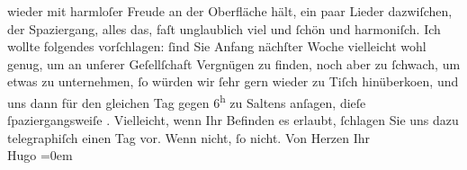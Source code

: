 \begin{ledgroupsized}[t]{13cm}
               wieder mit harmloſer Freude an der Oberfläche hält, ein paar Lieder dazwiſchen, {\pb}der Spaziergang, alles das, faſt
               unglaublich viel und ſchön und harmoniſch.\pend
           \pstart
           Ich wollte folgendes vorſchlagen: ſind Sie Anfang nächſter Woche vielleicht wohl
               genug, um an unſerer Geſellſchaft Vergnügen zu finden, noch aber zu ſchwach, um etwas
               zu unternehmen, ſo würden {\pb}wir
               ſehr gern wieder zu Tiſch hinüberko{\geminationm}en, und uns dann für
               den gleichen Tag gegen 6\textsuperscript{h} zu Saltens anſagen, dieſe ſpaziergangsweiſe \label{K_L01411-2v}\label{K_L01411-2h}.\pend
           \pstart
           Vielleicht, wenn Ihr Befinden es erlaubt, ſchlagen Sie uns dazu telegraphiſch einen
               Tag vor. Wenn nicht, ſo nicht.\pend
           \pstart
           Von Herzen Ihr{\\[\baselineskip]}\spacefill\mbox{Hugo}\pend
           \leftskip=0em{}
         
         \endnumbering{}\end{ledgroupsized}  \newcommand{\dateiname}{L01411}\newcommand{\titel}{Hugo von Hofmannsthal an Arthur Schnitzler, 28. 6. 1904}\newcommand{\editorInnen}{Martin Anton Müller und Gerd-Hermann Susen}
      